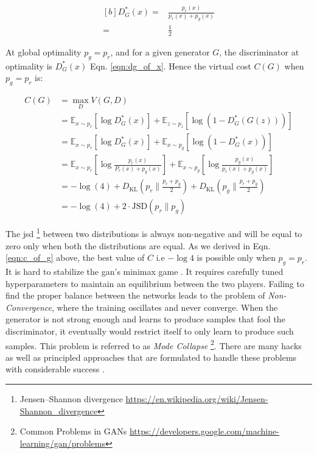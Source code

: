 \begin{equation} \label{eqn:dg_of_x}
    \begin{aligned}[b]
        D_{G}^*(x) = & \frac{p_{r}(x)}{p_{r}(x)+p_{g}(x)} \\
        =            & \frac{1}{2}
    \end{aligned}
\end{equation}

At global optimality $p_{g}=p_{r}$, and for a given generator $G$, the discriminator at optimality is $D_{G}^*(x)$ Eqn. \ref{eqn:dg_of_x}. Hence the virtual cost $C(G)$ \cite{goodfellow2014generative} when $p_{g}=p_{r}$ is:

\begin{equation} \label{eqn:c_of_g}
    \begin{aligned}
        C(G) & = \max _{D} V(G, D)                                                                                                                                          \\
             & =\mathbb{E}_{x \sim p_{r}}\left[\log D_{G}^{*}(x)\right]+\mathbb{E}_{z \sim p_{z}}\left[\log \left(1-D_{G}^{*}(G(z))\right)\right]                           \\
             & =\mathbb{E}_{x \sim p_{r}}\left[\log D_{G}^{*}(x)\right]+\mathbb{E}_{x \sim p_{g}}\left[\log \left(1-D_{G}^{*}(x)\right)\right]                              \\
             & =\mathbb{E}_{x \sim p_{r}}\left[\log \frac{p_{r}(x)}{P_{r}(x)+p_{g}(x)}\right]+\mathbb{E}_{x \sim p_{g}}\left[\log \frac{p_{g}(x)}{p_{r}(x)+p_{g}(x)}\right] \\
             & =-\log (4)+ D_{\mathrm{KL}}\left(p_{r} \| \frac{p_{r}+p_{g}}{2}\right)+D_{\mathrm{KL}}\left(p_{g} \| \frac{p_{r}+p_{g}}{2}\right)                            \\
             & =-\log(4) + 2 \cdot  \mathrm{JSD}(p_{r} \| p_{g})
    \end{aligned}
\end{equation}

The \ac{jsd} \footnote{Jensen–Shannon divergence \url{https://en.wikipedia.org/wiki/Jensen-Shannon_divergence}} between two distributions is always non-negative and will be equal to zero only when both the distributions are equal. As we derived in Eqn. \ref{eqn:c_of_g} above, the best value of $C$ i.e $-\log 4$ is possible only when $p_{g}=p_{r}$. It is hard to stabilize the \ac{gan}'s minimax game \cite{martin2017principled}. It requires carefully tuned hyperparameters to maintain an equilibrium between the two players. Failing to find the proper balance between the networks leads to the problem of \textit{Non-Convergence}, where the training oscillates and never converge. When the generator is not strong enough and learns to produce samples that fool the discriminator, it eventually would restrict itself to only learn to produce such samples. This problem is referred to as \textit{Mode Collapse} \footnote{Common Problems in GANs \url{https://developers.google.com/machine-learning/gan/problems}}. There are many hacks as well as principled approaches that are formulated to handle these problems with considerable success \cite{openaigan2wgan}.

